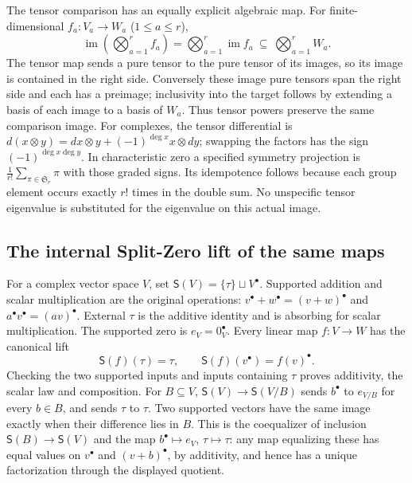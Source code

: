\documentclass{article}
\begin{document}
The tensor comparison has an equally explicit algebraic map.  For
finite-dimensional $f_a:V_a\to W_a$ ($1\leq a\leq r$),
\[
 \operatorname{im}\left(\bigotimes_{a=1}^r f_a\right)
 =\bigotimes_{a=1}^r\operatorname{im}f_a
 \ \subseteq\ \bigotimes_{a=1}^r W_a.
 \tag{DS9}
\]
The tensor map sends a pure tensor to the pure tensor of its images,
so its image is contained in the right side.  Conversely these image
pure tensors span the right side and each has a preimage; inclusivity
into the target follows by extending a basis of each image to a basis
of $W_a$.  Thus tensor powers preserve the same comparison image.
For complexes, the tensor differential is
$d(x\otimes y)=dx\otimes y+(-1)^{\deg x}x\otimes dy$; swapping
the factors has the sign $(-1)^{\deg x\deg y}$.  In characteristic
zero a specified symmetry projection is
$\frac1{r!}\sum_{\pi\in\mathfrak S_r}\pi$ with those graded signs.
Its idempotence follows because each group element occurs exactly
$r!$ times in the double sum.  No unspecific tensor eigenvalue is
substituted for the eigenvalue on this actual image.

\subsection{The internal Split-Zero lift of the same maps}

For a complex vector space $V$, set $\mathsf S(V)=\{\tau\}\sqcup V^\bullet$.
Supported addition and scalar multiplication are the original operations:
$v^\bullet+w^\bullet=(v+w)^\bullet$ and
$a^\bullet v^\bullet=(av)^\bullet$.  External $\tau$ is the additive
identity and is absorbing for scalar multiplication.  The supported
zero is $e_V=0_V^\bullet$.  Every linear map $f:V\to W$ has the
canonical lift
\[
 \mathsf S(f)(\tau)=\tau,\qquad
 \mathsf S(f)(v^\bullet)=f(v)^\bullet.
 \tag{DS10}
\]
Checking the two supported inputs and inputs containing $\tau$ proves
additivity, the scalar law and composition.  For $B\subseteq V$,
$\mathsf S(V)\to\mathsf S(V/B)$ sends $b^\bullet$ to $e_{V/B}$ for
every $b\in B$, and sends $\tau$ to $\tau$.  Two supported vectors
have the same image exactly when their difference lies in $B$.
This is the coequalizer of inclusion $\mathsf S(B)\to\mathsf S(V)$
and the map $b^\bullet\mapsto e_V$, $\tau\mapsto\tau$: any map
equalizing these has equal values on $v^\bullet$ and $(v+b)^\bullet$,
by additivity, and hence has a unique factorization through the
displayed quotient.
\end{document}
